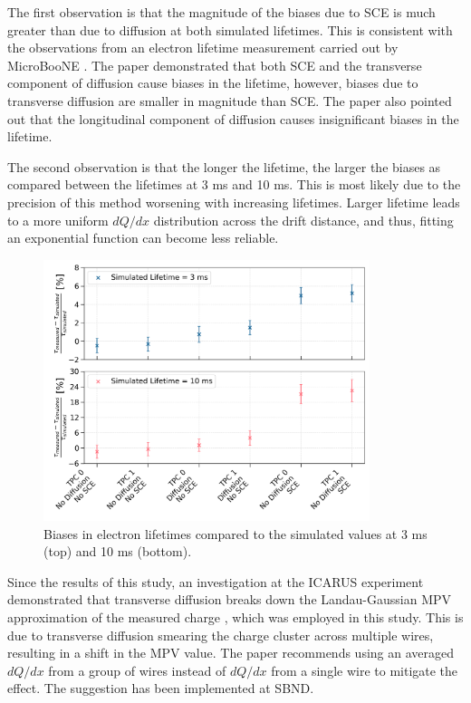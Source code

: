 The first observation is that the magnitude of the biases due to SCE is much greater than due to diffusion at both simulated lifetimes.
This is consistent with the observations from an electron lifetime measurement carried out by MicroBooNE \cite{ubooneEtime}. 
The paper demonstrated that both SCE and the transverse component of diffusion cause biases in the lifetime, however, biases due to transverse diffusion are smaller in magnitude than SCE.
The paper also pointed out that the longitudinal component of diffusion causes insignificant biases in the lifetime.

The second observation is that the longer the lifetime, the larger the biases as compared between the lifetimes at 3 ms and 10 ms.
This is most likely due to the precision of this method worsening with increasing lifetimes.
Larger lifetime leads to a more uniform $dQ/dx$ distribution across the drift distance, and thus, fitting an exponential function can become less reliable.

\begin{figure}[t!] 
\centering    
\includegraphics[width=0.85\textwidth]{etime_biases_compare}
\caption[Electron Lifetime Measurement Biases]{
Biases in electron lifetimes compared to the simulated values at 3 ms (top) and 10 ms (bottom).
}
\label{fig:etime_biases_compare}
\end{figure}

Since the results of this study, an investigation at the ICARUS experiment demonstrated that transverse diffusion breaks down the Landau-Gaussian MPV approximation of the measured charge \cite{GrayDiffusion}, which was employed in this study.
This is due to transverse diffusion smearing the charge cluster across multiple wires, resulting in a shift in the MPV value. 
The paper recommends using an averaged $dQ/dx$ from a group of wires instead of $dQ/dx$ from a single wire to mitigate the effect.
The suggestion has been implemented at SBND.

